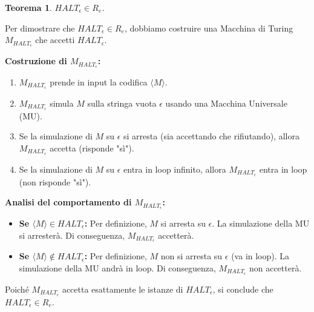 \documentclass[a4paper]{article}
\makeatletter
\newtheorem{theorem}{Teorema}[section] %
\renewenvironment{proof}[1][\proofname]{\par
  \pushQED{\qed}%
  \normalfont \topsep6\p@\@plus6\p@\relax
  \trivlist
  \item[\hskip\labelsep
        \bfseries
    #1\@addpunct{.}]\ignorespaces
}{%
  \popQED\endtrivlist\@endpefalse
}
\makeatother
\begin{document}
\begin{theorem}
$HALT_\epsilon \in R_e$.
\end{theorem}
\begin{proof}
Per dimostrare che $HALT_\epsilon \in R_e$, dobbiamo costruire una Macchina di Turing $M_{HALT_\epsilon}$ che accetti $HALT_\epsilon$.

\textbf{Costruzione di $M_{HALT_\epsilon}$:}
\begin{enumerate}
    \item $M_{HALT_\epsilon}$ prende in input la codifica $\langle M \rangle$.
    \item $M_{HALT_\epsilon}$ simula $M$ sulla stringa vuota $\epsilon$ usando una Macchina Universale (MU).
    \item Se la simulazione di $M$ su $\epsilon$ si arresta (sia accettando che rifiutando), allora $M_{HALT_\epsilon}$ accetta (risponde "sì").
    \item Se la simulazione di $M$ su $\epsilon$ entra in loop infinito, allora $M_{HALT_\epsilon}$ entra in loop (non risponde "sì").
\end{enumerate}
\textbf{Analisi del comportamento di $M_{HALT_\epsilon}$:}
\begin{itemize}
    \item \textbf{Se $\langle M \rangle \in HALT_\epsilon$:}
    Per definizione, $M$ si arresta su $\epsilon$. La simulazione della MU si arresterà. Di conseguenza, $M_{HALT_\epsilon}$ accetterà.
    \item \textbf{Se $\langle M \rangle \notin HALT_\epsilon$:}
    Per definizione, $M$ non si arresta su $\epsilon$ (va in loop). La simulazione della MU andrà in loop. Di conseguenza, $M_{HALT_\epsilon}$ non accetterà.
\end{itemize}
Poiché $M_{HALT_\epsilon}$ accetta esattamente le istanze di $HALT_\epsilon$, si conclude che $HALT_\epsilon \in R_e$.
\end{proof}
\end{document}
